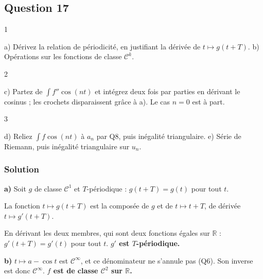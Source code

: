 \documentclass[11pt,a4paper]{article}
\newcommand{\equationajustee}[1]{%
  \sbox{\boiteequation}{$\displaystyle #1$}%
  \ifdim\wd\boiteequation>\linewidth
    \[\resizebox{\linewidth}{!}{\usebox{\boiteequation}}\]%
  \else
    \[#1\]%
  \fi}
\begin{document}
\equationajustee{\boxed{\begin{aligned}\forall t\in\mathbb R,\quad\sum_{n=0}^{+\infty}u_n\cos(nt)&=f(t)-f(t)\\ &=0.\end{aligned}}}

\hypertarget{question-17}{%
\subsection{Question 17}\label{question-17}}

\begin{indication}{1}

a) Dérivez la relation de périodicité, en justifiant la dérivée de \(t\mapsto g(t+T)\). b) Opérations sur les fonctions de classe \(\mathcal C^k\).

\end{indication}

\begin{indication}{2}

c) Partez de \(\int f''\cos(nt)\) et intégrez deux fois par parties en dérivant le cosinus ; les crochets disparaissent grâce à a). Le cas \(n=0\) est à part.

\end{indication}

\begin{indication}{3}

d) Reliez \(\int f\cos(nt)\) à \(a_n\) par Q8, puis inégalité triangulaire. e) Série de Riemann, puis inégalité triangulaire sur \(u_n\).

\end{indication}

\hypertarget{solution-16}{%
\subsubsection{Solution}\label{solution-16}}

\textbf{a)} Soit \(g\) de classe \(\mathcal C^1\) et \(T\)-périodique : \(g(t+T)=g(t)\) pour tout \(t\).

La fonction \(t\mapsto g(t+T)\) est la composée de \(g\) et de \(t\mapsto t+T\), de dérivée \(t\mapsto g'(t+T)\).

En dérivant les deux membres, qui sont deux fonctions égales sur \(\mathbb R\) : \(g'(t+T)=g'(t)\) pour tout \(t\). \textbf{\(g'\) est \(T\)-périodique.}

\textbf{b)} \(t\mapsto a-\cos t\) est \(\mathcal C^\infty\), et ce dénominateur ne s'annule pas (Q6). Son inverse est donc \(\mathcal C^\infty\). \textbf{\(f\) est de classe \(\mathcal C^2\) sur \(\mathbb R\).}
\end{document}
